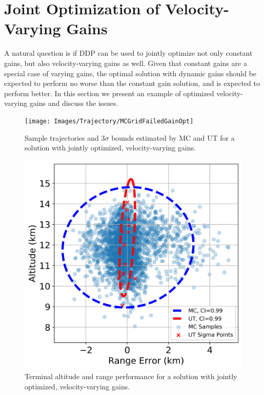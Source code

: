 \section{Joint Optimization of Velocity-Varying Gains}
A natural question is if DDP can be used to jointly optimize not only constant gains, but also velocity-varying gains as well. Given that constant gains are a special case of varying gains, the optimal solution with dynamic gains should be expected to perform no worse than the constant gain solution, and is expected to perform better. In this section we present an example of optimized velocity-varying gains and discuss the issues. 
\begin{figure}[h!]
	\centering
	\texttt{[image: Images/Trajectory/MCGridFailedGainOpt]}
	\caption{Sample trajectories and 3$\sigma$ bounds estimated by MC and UT for a solution with jointly optimized, velocity-varying gains.}
	\label{Fig:GainOptTrajectory}
\end{figure}
\begin{figure}[h!]
	\centering
	\includegraphics[width=1\textwidth]{Images/Trajectory/AltitudeRangeScatterFailedGainOpt}
	\caption{Terminal altitude and range performance for a solution with jointly optimized, velocity-varying gains.}
	\label{Fig:GainOptScatter}
\end{figure}

